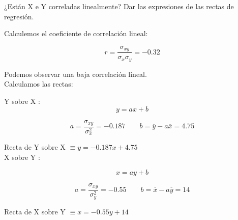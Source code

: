 \subproblem 
¿Están X e Y correladas linealmente? Dar las expresiones de las rectas de regresión.

Calculemos el coeficiente de correlación lineal:

$$r =  \dfrac{\sigma_{xy}}{\sigma_x \sigma_y} = -0.32$$

Podemos observar una baja correlación lineal.\\

Calculamos las rectas:

Y sobre X : 
$$y = ax + b$$

$$a = \dfrac{\sigma_{xy}}{\sigma_x^2} = -0.187 \qquad b = \overline{y} - a\overline{x} = 4.75 $$

Recta de Y sobre X $\equiv y = -0.187x + 4.75$\\

X sobre Y :

$$x = ay + b$$

$$a = \dfrac{\sigma_{xy}}{\sigma_y^2} = -0.55 \qquad b = \overline{x} - a\overline{y} = 14 $$

Recta de X sobre Y $\equiv x = -0.55y + 14$ 
